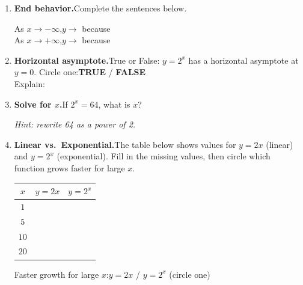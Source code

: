 \documentclass[12pt, letterpaper]{article}
\newcommand{\ws}{\vspace{3.2cm}}          %
\begin{document}
\begin{enumerate}[label=\textbf{C\arabic*.}, leftmargin=*, itemsep=0pt]
\vspace{2.4cm}

\item \textbf{End behavior.}\enspace Complete the sentences below.

\medskip
\noindent
As $x\to-\infty$,\quad $y\to$ \underline{\hspace{2cm}}\quad because \underline{\hspace{6.5cm}}\\[10pt]
As $x\to+\infty$,\quad $y\to$ \underline{\hspace{2cm}}\quad because \underline{\hspace{6.5cm}}

\vspace{0.6cm}

\item \textbf{Horizontal asymptote.}\enspace True or False: $y=2^x$ has a horizontal asymptote at $y=0$.
Circle one:\quad \textbf{TRUE} \quad / \quad \textbf{FALSE}\\[6pt]
Explain: \underline{\hspace{10cm}}

\vspace{0.6cm}

\item \textbf{Solve for $x$.}\enspace If $2^x = 64$, what is $x$?

\medskip
\textit{Hint: rewrite 64 as a power of 2.}
\ws

\item \textbf{Linear vs.\ Exponential.}\enspace The table below shows values for $y=2x$
(linear) and $y=2^x$ (exponential). Fill in the missing values, then circle which
function grows faster for large $x$.

\medskip
\begin{center}
\renewcommand{\arraystretch}{2.0}
\begin{tabular}{|c|c|c|}
\hline
$x$ & $y = 2x$ & $y = 2^x$ \\
\hline
$1$  & \hspace{2cm} & \hspace{2cm} \\
\hline
$5$  & \hspace{2cm} & \hspace{2cm} \\
\hline
$10$ & \hspace{2cm} & \hspace{2cm} \\
\hline
$20$ & \hspace{2cm} & \hspace{2cm} \\
\hline
\end{tabular}
\end{center}
\medskip
Faster growth for large $x$:\quad $y=2x$ \quad / \quad $y=2^x$ \quad (circle one)


\end{enumerate}
\end{document}
